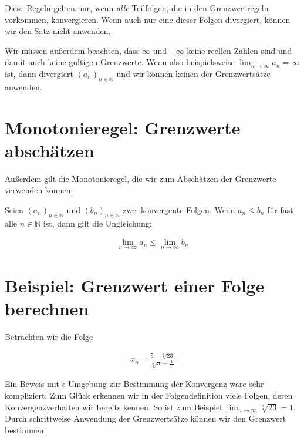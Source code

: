 \documentclass[fontsize=9pt,
               parskip=half-,
               DIV=14,
               listof=chapterentry,
               tocflat]{scrbook}
\begin{document}
\begin{warning*}
Diese Regeln gelten nur, wenn \emph{alle} Teilfolgen, die in den Grenzwertregeln vorkommen, konvergieren. Wenn auch nur eine dieser Folgen divergiert, können wir den Satz nicht anwenden.

Wir müssen außerdem beachten, dass $\infty $ und $-\infty $ keine reellen Zahlen sind und damit auch keine gültigen Grenzwerte. Wenn also beispielsweise $\lim _{n\rightarrow \infty }a_{n}=\infty $ ist, dann divergiert $\left(a_{n}\right)_{n\in \mathbb {N} }$ und wir können keinen der Grenzwertsätze anwenden.

\end{warning*}

\section{Monotonieregel: Grenzwerte abschätzen}

Außerdem gilt die Monotonieregel, die wir zum Abschätzen der Grenzwerte verwenden können:

\begin{theorem*}[Monotonieregel]
Seien $\left(a_{n}\right)_{n\in \mathbb {N} }$ und $\left(b_{n}\right)_{n\in \mathbb {N} }$ zwei konvergente Folgen. Wenn $a_{n}\leq b_{n}$ für fast alle $n\in \mathbb {N} $ ist, dann gilt die Ungleichung:

\begin{align*}
\lim _{n\rightarrow \infty }a_{n}\leq \lim _{n\rightarrow \infty }b_{n}
\end{align*}

\end{theorem*}

\section{Beispiel: Grenzwert einer Folge berechnen}

Betrachten wir die Folge

\begin{align*}
x_{n}={\frac {5-{\sqrt[{n}]{23}}}{{\sqrt[{n}]{n}}+{\tfrac {1}{n^{2}}}}}
\end{align*}

Ein Beweis mit $\epsilon $-Umgebung zur Bestimmung der Konvergenz wäre sehr kompliziert. Zum Glück erkennen wir in der Folgendefinition viele Folgen, deren Konvergenzverhalten wir bereits kennen. So ist zum Beispiel $\lim _{n\rightarrow \infty }{\sqrt[{n}]{23}}=1$. Durch schrittweise Anwendung der Grenzwertsätze können wir den Grenzwert bestimmen:
\end{document}
